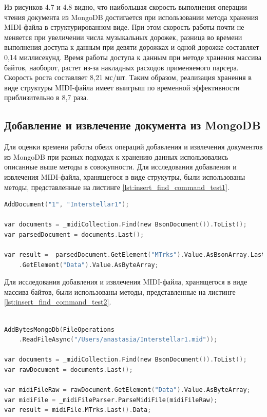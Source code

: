 Из рисунков 4.7 и 4.8 видно, что наибольшая скорость выполнения операции чтения документа из MongoDB достигается при использовании метода хранения MIDI-файла в структурированном виде. При этом скорость работы почти не меняется при увеличении числа музыкальных дорожек, разница во времени выполнения доступа к данным при девяти дорожках и одной дорожке составляет 0,14 миллисекунд. Время работы доступа к данным при методе хранения массива байтов, наоборот, растет из-за накладных расходов применяемого парсера. Скорость роста составляет 8,21 мс/шт. Таким образом, реализация хранения в виде структуры MIDI-файла имеет выигрыш по временной эффективности приблизительно в 8,7 раза.

\subsection{Добавление и извлечение документа из MongoDB}

Для оценки времени работы обеих операций добавления и извлечения документов из MongoDB при разных подходах к хранению данных использовались описанные выше методы в совокупности. 
Для исследования добавления и извлечения MIDI-файла, хранящегося в виде струкутры, были использованы методы, представленные на листинге \ref{lst:insert_find_command_test1}. 

\begin{lstlisting}[language=C, label=some-code, caption=Добавление и извлечение MIDI-файла из MongoDB c использованием реализованного метода, label=lst:insert_find_command_test1]
AddDocument("1", "Interstellar1");

var documents = _midiCollection.Find(new BsonDocument()).ToList();
var parsedDocument = documents.Last();

var result =  parsedDocument.GetElement("MTrks").Value.AsBsonArray.Last().AsBsonDocument
    .GetElement("Data").Value.AsByteArray;
\end{lstlisting}

Для исследования добавления и извлечения MIDI-файла, хранящегося в виде массива байтов, были использованы методы, представленные на листинге \ref{lst:insert_find_command_test2}.

\newpage

\begin{lstlisting}[language=C, label=some-code, caption=Добавление и извлечение MIDI-файла из MongoDB в виде массива байтов, label=lst:insert_find_command_test2]

AddBytesMongoDb(FileOperations
    .ReadFileAsync("/Users/anastasia/Interstellar1.mid"));

var documents = _midiCollection.Find(new BsonDocument()).ToList();
var rawDocument = documents.Last();

var midiFileRaw = rawDocument.GetElement("Data").Value.AsByteArray;
var midiFile = _midiFileParser.ParseMidiFile(midiFileRaw);
var result = midiFile.MTrks.Last().Data;
\end{lstlisting}

